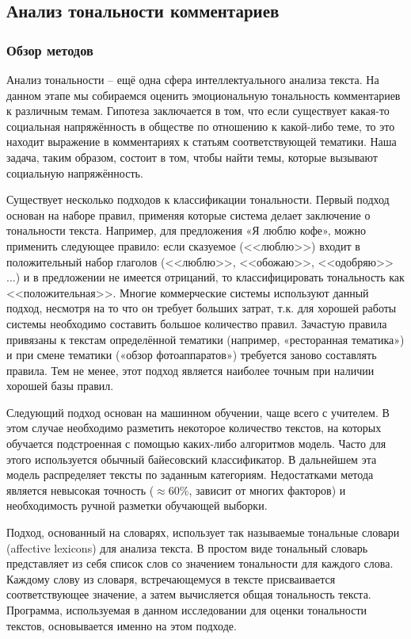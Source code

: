 \subsection{Анализ тональности комментариев}
\subsubsection{Обзор методов}
Анализ тональности -- ещё одна сфера интеллектуального анализа текста. На данном этапе мы собираемся оценить эмоциональную тональность комментариев к различным темам. Гипотеза заключается в том, что если существует какая-то социальная напряжённость в обществе по отношению к какой-либо теме, то это находит выражение в комментариях к статьям соответствующей тематики. Наша задача, таким образом, состоит в том, чтобы найти темы, которые вызывают социальную напряжённость.

Существует несколько подходов к классификации тональности. Первый подход основан на наборе правил, применяя которые система делает заключение о тональности текста. Например, для предложения «Я люблю кофе», можно применить следующее правило: если сказуемое (<<люблю>>) входит в положительный набор глаголов (<<люблю>>, <<обожаю>>, <<одобряю>> ...) и в предложении не имеется отрицаний, то классифицировать тональность как <<положительная>>. Многие коммерческие системы используют данный подход, несмотря на то что он требует больших затрат, т.к. для хорошей работы системы необходимо составить большое количество правил. Зачастую правила привязаны к текстам определённой тематики (например, «ресторанная тематика») и при смене тематики («обзор фотоаппаратов») требуется заново составлять правила. Тем не менее, этот подход является наиболее точным при наличии хорошей базы правил.

Следующий подход основан на машинном обучении, чаще всего с учителем. В этом случае необходимо разметить некоторое количество текстов, на которых обучается подстроенная с помощью каких-либо алгоритмов модель. Часто для этого используется обычный байесовский классификатор. В дальнейшем эта модель распределяет тексты по заданным категориям. Недостатками метода является невысокая точность ($\approx60$\%, зависит от многих факторов) и необходимость ручной разметки обучающей выборки.

Подход, основанный на словарях, использует так называемые тональные словари (affective lexicons) для анализа текста. В простом виде тональный словарь представляет из себя список слов со значением тональности для каждого слова. Каждому слову из словаря, встречающемуся в тексте присваивается соответствующее значение, а затем вычисляется общая тональность текста. Программа, используемая в данном исследовании для оценки тональности текстов, основывается именно на этом подходе.

